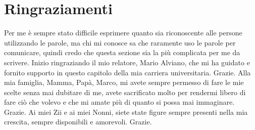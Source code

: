 \documentclass[a4paper,12pt,oneside]{book}
\begin{document}
\tableofcontents
\listoffigures






\chapter*{Ringraziamenti}
Per me è sempre stato difficile esprimere quanto sia riconoscente alle persone utilizzando le parole, ma chi mi conosce sa che raramente uso le parole per comunicare, quindi credo che questa sezione sia la più complicata per me da scrivere.
Inizio ringraziando il mio relatore, Mario Alviano, che mi ha guidato e fornito supporto in questo capitolo della mia carriera universitaria. Grazie.
Alla mia famiglia, Mamma, Papà, Marco, mi avete sempre permesso di fare le mie scelte senza mai dubitare di me, avete sacrificato molto per rendermi libero di fare ciò che volevo e che mi amate più di quanto si possa mai immaginare. Grazie.
Ai miei Zii e ai miei Nonni, siete state figure sempre presenti nella mia crescita, sempre disponibili e amorevoli. Grazie. 
\end{document}
